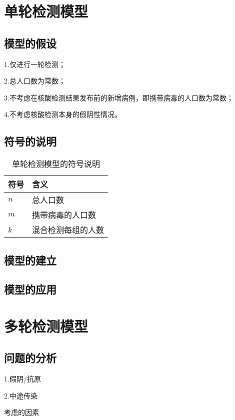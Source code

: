 \documentclass[12pt]{article}
\begin{document}
\newpage
{\centering\section{单轮检测模型}}

\subsection{模型的假设}

1.仅进行一轮检测；

2.总人口数为常数；

3.不考虑在核酸检测结果发布前的新增病例，即携带病毒的人口数为常数；

4.不考虑核酸检测本身的假阴性情况。

\subsection{符号的说明}

\begin{table}[h]
\centering
\begin{tabular}{|l|l|} 
\hline
符号 & 含义 \\
\hline
$n$ & 总人口数 \\
$m$ & 携带病毒的人口数 \\
$k$ & 混合检测每组的人数 \\
\hline
\end{tabular}
\caption{单轮检测模型的符号说明}
\end{table}

\subsection{模型的建立}

\subsection{模型的应用}

{\centering\section{多轮检测模型}}

\subsection{问题的分析}

1.假阴/抗原

2.中途传染

考虑的因素
\end{document}
